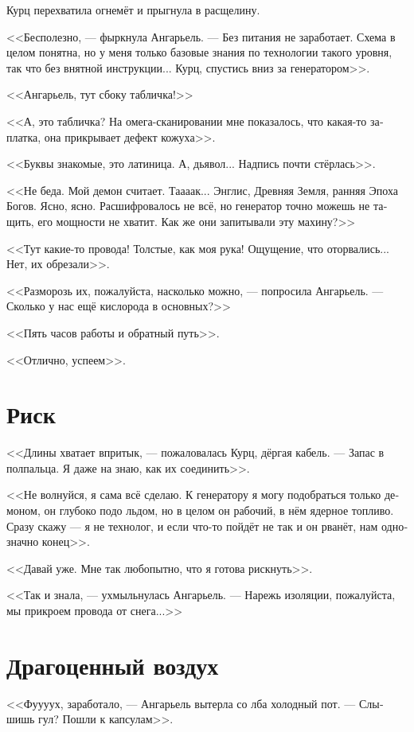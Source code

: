 \documentclass[a4paper,12pt,fleqn]{book}\usepackage{cooltooltips}\usepackage{polyglossia}\setdefaultlanguage[babelshorthands=true]{russian}\setotherlanguage{english}\defaultfontfeatures{Ligatures=TeX,Mapping=tex-text} \usepackage{xcolor}\definecolor{lightgray}{HTML}{bbbbbb}\color{lightgray}\newcommand{\ml}[3]{\textenglish{\textcolor{black}{#3}}}
\begin{document}
Курц перехватила огнемёт и прыгнула в расщелину.

<<Бесполезно, --- фыркнула Ангарьель.
--- Без питания не заработает.
Схема в целом понятна, но у меня только базовые знания по технологии такого уровня, так что без внятной инструкции...
Курц, спустись вниз за генератором>>.

<<Ангарьель, тут сбоку табличка!>>

<<А, это табличка?
На омега-сканировании мне показалось, что какая-то заплатка, она прикрывает дефект кожуха>>.

<<Буквы знакомые, это латиница.
А, дьявол...
Надпись почти стёрлась>>.

<<Не беда.
Мой демон считает.
Таааак...
Энглис, Древняя Земля, ранняя Эпоха Богов.
Ясно, ясно.
Расшифровалось не всё, но генератор точно можешь не тащить, его мощности не хватит.
Как же они запитывали эту махину?>>

<<Тут какие-то провода!
Толстые, как моя рука!
Ощущение, что оторвались...
Нет, их обрезали>>.

<<Разморозь их, пожалуйста, насколько можно, --- попросила Ангарьель.
--- Сколько у нас ещё кислорода в основных?>>

<<Пять часов работы и обратный путь>>.

<<Отлично, успеем>>.

\section{Риск}

<<Длины хватает впритык, --- пожаловалась Курц, дёргая кабель.
--- Запас в полпальца.
Я даже на знаю, как их соединить>>.

<<Не волнуйся, я сама всё сделаю.
К генератору я могу подобраться только демоном, он глубоко подо льдом, но в целом он рабочий, в нём ядерное топливо.
Сразу скажу --- я не технолог, и если что-то пойдёт не так и он рванёт, нам однозначно конец>>.

<<Давай уже.
Мне так любопытно, что я готова рискнуть>>.

<<Так и знала, --- ухмыльнулась Ангарьель.
--- Нарежь изоляции, пожалуйста, мы прикроем провода от снега...>>

\section{Драгоценный воздух}

<<Фуууух, заработало, --- Ангарьель вытерла со лба холодный пот.
--- Слышишь гул?
Пошли к капсулам>>.
\end{document}
